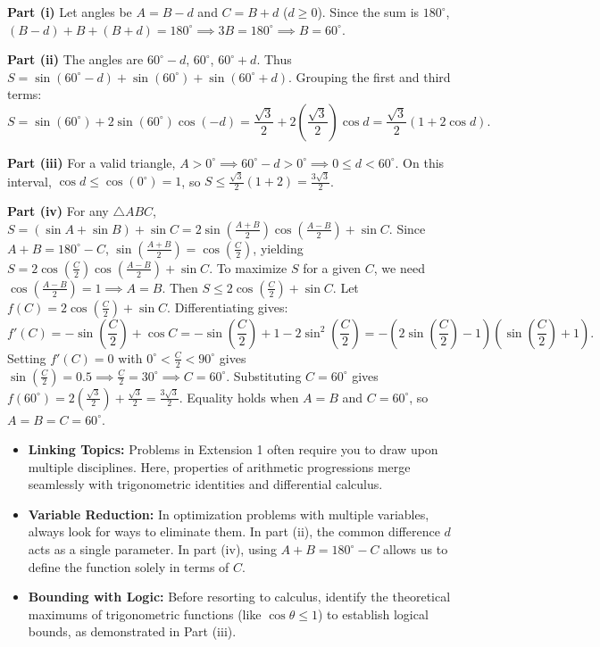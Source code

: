 \begin{solution}
\textbf{Part (i)} Let angles be $A = B - d$ and $C = B + d$ ($d \ge 0$). Since the sum is $180^\circ$, $(B-d) + B + (B+d) = 180^\circ \implies 3B = 180^\circ \implies B = 60^\circ$.

\textbf{Part (ii)} The angles are $60^\circ - d$, $60^\circ$, $60^\circ + d$. Thus $S = \sin(60^\circ - d) + \sin(60^\circ) + \sin(60^\circ + d)$. Grouping the first and third terms:
\[
S = \sin(60^\circ) + 2\sin(60^\circ)\cos(-d) = \frac{\sqrt{3}}{2} + 2\left(\frac{\sqrt{3}}{2}\right)\cos d = \frac{\sqrt{3}}{2}(1 + 2\cos d).
\]

\textbf{Part (iii)} For a valid triangle, $A > 0^\circ \implies 60^\circ - d > 0^\circ \implies 0 \le d < 60^\circ$. On this interval, $\cos d \le \cos(0^\circ) = 1$, so $S \le \frac{\sqrt{3}}{2}(1 + 2) = \frac{3\sqrt{3}}{2}$.

\textbf{Part (iv)} For any $\triangle ABC$, $S = (\sin A + \sin B) + \sin C = 2\sin\left(\frac{A+B}{2}\right)\cos\left(\frac{A-B}{2}\right) + \sin C$. Since $A+B = 180^\circ - C$, $\sin\left(\frac{A+B}{2}\right) = \cos\left(\frac{C}{2}\right)$, yielding $S = 2\cos\left(\frac{C}{2}\right)\cos\left(\frac{A-B}{2}\right) + \sin C$.
To maximize $S$ for a given $C$, we need $\cos\left(\frac{A-B}{2}\right) = 1 \implies A = B$. Then $S \le 2\cos\left(\frac{C}{2}\right) + \sin C$.
Let $f(C) = 2\cos\left(\frac{C}{2}\right) + \sin C$. Differentiating gives:
\[
f'(C) = -\sin\left(\frac{C}{2}\right) + \cos C = -\sin\left(\frac{C}{2}\right) + 1 - 2\sin^2\left(\frac{C}{2}\right) = -\left(2\sin\left(\frac{C}{2}\right) - 1\right)\left(\sin\left(\frac{C}{2}\right) + 1\right).
\]
Setting $f'(C) = 0$ with $0^\circ < \frac{C}{2} < 90^\circ$ gives $\sin\left(\frac{C}{2}\right) = 0.5 \implies \frac{C}{2} = 30^\circ \implies C = 60^\circ$.
Substituting $C=60^\circ$ gives $f(60^\circ) = 2\left(\frac{\sqrt{3}}{2}\right) + \frac{\sqrt{3}}{2} = \frac{3\sqrt{3}}{2}$. Equality holds when $A=B$ and $C=60^\circ$, so $A=B=C=60^\circ$.
\end{solution}

\begin{takeaways}
\begin{itemize}[leftmargin=*]
  \item \textbf{Linking Topics:} Problems in Extension 1 often require you to draw upon multiple disciplines. Here, properties of arithmetic progressions merge seamlessly with trigonometric identities and differential calculus.
  \item \textbf{Variable Reduction:} In optimization problems with multiple variables, always look for ways to eliminate them. In part (ii), the common difference $d$ acts as a single parameter. In part (iv), using $A+B = 180^\circ - C$ allows us to define the function solely in terms of $C$.
  \item \textbf{Bounding with Logic:} Before resorting to calculus, identify the theoretical maximums of trigonometric functions (like $\cos \theta \le 1$) to establish logical bounds, as demonstrated in Part (iii).
\end{itemize}
\end{takeaways}
